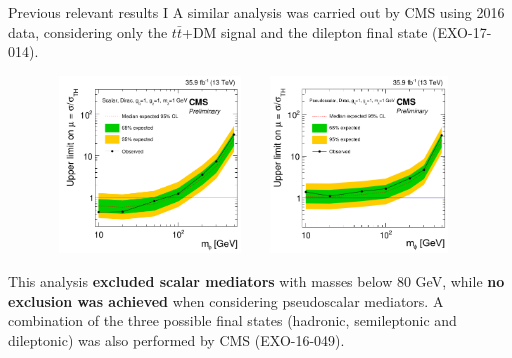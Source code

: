 \documentclass[8pt]{beamer}
\begin{document}
\begin{frame}{Previous relevant results I}
\justifying
\vspace{5pt}
A \alert{similar analysis was carried out by CMS} using 2016 data, considering only the $t \bar t$+DM signal and the dilepton final state (EXO-17-014). \vfill %


\begin{figure}[htbp]
\centering
\begin{minipage}[b]{.49\textwidth}
\includegraphics[width=5.4cm, height=4.7cm]{figs/Juan_S.png}
\end{minipage}\hfill
\begin{minipage}[b]{.49\textwidth}
\includegraphics[width=5.4cm, height=4.7cm]{figs/Juan_PS.png}
\end{minipage}\hfill
\label{fig:Juan}
\end{figure}

This analysis \textbf{excluded scalar mediators} with masses below 80 GeV, while \textbf{no exclusion was achieved} when considering pseudoscalar mediators. \vfill
A \alert{combination of the three possible final states} (hadronic, semileptonic and dileptonic) was also performed by CMS (EXO-16-049). \vfill

\end{frame}
\end{document}
